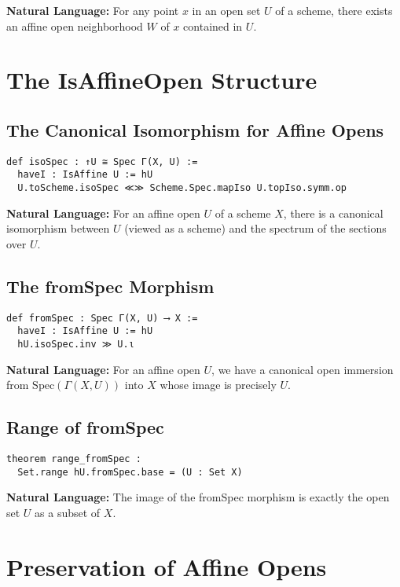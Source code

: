 \documentclass{article}
\theoremstyle{definition}
\begin{document}
\textbf{Natural Language:} For any point $x$ in an open set $U$ of a scheme, there exists an affine open neighborhood $W$ of $x$ contained in $U$.

\section{The IsAffineOpen Structure}

\subsection{The Canonical Isomorphism for Affine Opens}

\begin{lstlisting}
def isoSpec : ↑U ≅ Spec Γ(X, U) :=
  haveI : IsAffine U := hU
  U.toScheme.isoSpec ≪≫ Scheme.Spec.mapIso U.topIso.symm.op
\end{lstlisting}

\textbf{Natural Language:} For an affine open $U$ of a scheme $X$, there is a canonical isomorphism between $U$ (viewed as a scheme) and the spectrum of the sections over $U$.

\subsection{The fromSpec Morphism}

\begin{lstlisting}
def fromSpec : Spec Γ(X, U) ⟶ X :=
  haveI : IsAffine U := hU
  hU.isoSpec.inv ≫ U.ι
\end{lstlisting}

\textbf{Natural Language:} For an affine open $U$, we have a canonical open immersion from $\mathrm{Spec}(\Gamma(X, U))$ into $X$ whose image is precisely $U$.

\subsection{Range of fromSpec}

\begin{lstlisting}
theorem range_fromSpec :
  Set.range hU.fromSpec.base = (U : Set X)
\end{lstlisting}

\textbf{Natural Language:} The image of the fromSpec morphism is exactly the open set $U$ as a subset of $X$.

\section{Preservation of Affine Opens}
\end{document}
